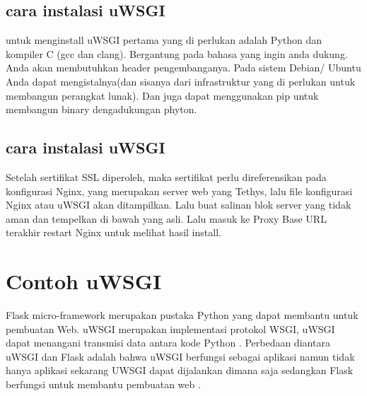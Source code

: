 \subsection{cara instalasi uWSGI}
untuk menginstall uWSGI pertama yang di perlukan adalah Python dan kompiler C (gcc dan clang). Bergantung pada bahasa yang ingin anda dukung. Anda akan membutuhkan header pengembanganya. Pada sistem Debian/ Ubuntu Anda dapat mengistalnya(dan sisanya dari infrastruktur yang di perlukan untuk membangun perangkat lunak). Dan juga dapat menggunakan pip untuk membangun binary dengadukungan phyton\cite{berger2017usage}.

\subsection {cara instalasi uWSGI}
Setelah sertifikat SSL diperoleh, maka sertifikat perlu direferensikan pada konfigurasi Nginx, yang merupakan server web yang Tethys, lalu file konfigurasi Nginx atau uWSGI akan ditampilkan. Lalu buat salinan blok server yang tidak aman dan tempelkan di bawah yang asli. Lalu masuk ke Proxy Base URL terakhir restart Nginx untuk melihat hasil install\cite{swain2018tethys}.

\section{Contoh uWSGI}
Flask micro-framework merupakan pustaka Python yang dapat membantu untuk pembuatan Web. uWSGI merupakan implementasi protokol WSGI, uWSGI dapat menangani transmisi data
antara kode Python . Perbedaan diantara uWSGI dan Flask adalah bahwa uWSGI berfungsi sebagai aplikasi namun tidak hanya aplikasi sekarang UWSGI dapat dijalankan dimana saja sedangkan Flask berfungsi untuk membantu pembuatan web \cite{mulerolinked}.



